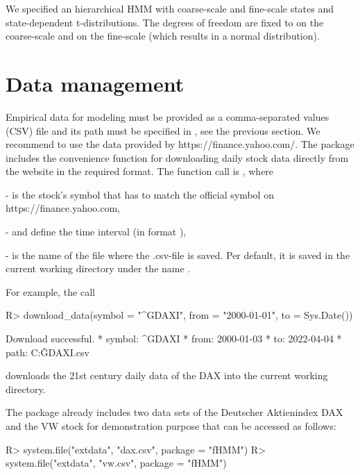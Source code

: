 \documentclass[article]{jss}
\newcommand{\fct}[1]{\code{#1()}}
\begin{document}
We specified an hierarchical HMM with  coarse-scale and  fine-scale states  and state-dependent t-distributions. The degrees of freedom are fixed to  on the coarse-scale and  on the fine-scale (which results in a normal distribution).


\section{Data management} \label{sec:data_management} %

Empirical data for modeling must be provided as a comma-separated values (CSV) file and its path must be specified in \fct{set\_controls}, see the previous section. We recommend to use the data provided by https://finance.yahoo.com/. The  package includes the convenience function \fct{download\_data} for downloading daily stock data directly from the website in the required format. The function call is , where

-  is the stock's symbol that has to match the official symbol on https://finance.yahoo.com,

-  and  define the time interval (in format ),

-  is the name of the file where the .csv-file is saved. Per default, it is saved in the current working directory under the name .

For example, the call

%
\begin{Schunk}
\begin{Sinput}
R> download_data(symbol = "^GDAXI", from = "2000-01-01", to = Sys.Date())
\end{Sinput}
\begin{Soutput}
Download successful.
* symbol: ^GDAXI 
* from: 2000-01-03 
* to: 2022-04-04 
* path: C:\Users\Lennart\Projekte\fHMM\jss\^GDAXI.csv
\end{Soutput}
\end{Schunk}
%

downloads the 21st century daily data of the DAX into the current working directory.

The  package already includes two data sets of the Deutscher Aktienindex DAX and the VW stock for demonstration purpose that can be accessed as follows:

%
\begin{Schunk}
\begin{Sinput}
R> system.file("extdata", "dax.csv", package = "fHMM")
R> system.file("extdata", "vw.csv", package = "fHMM")
\end{Sinput}
\end{Schunk}
%
\end{document}
